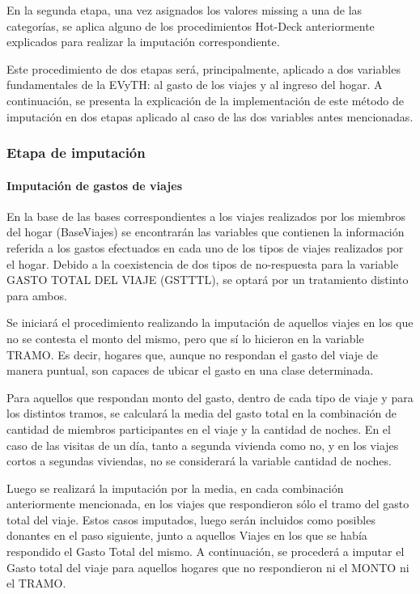 \documentclass[
  openany]{book}
\begin{document}
En la segunda etapa, una vez asignados los valores missing a una de las categorías, se aplica alguno de los procedimientos Hot-Deck anteriormente explicados para realizar la imputación correspondiente.

Este procedimiento de dos etapas será, principalmente, aplicado a dos variables fundamentales de la EVyTH: al gasto de los viajes y al ingreso del hogar. A continuación, se presenta la explicación de la implementación de este método de imputación en dos etapas aplicado al caso de las dos variables antes mencionadas.

\hypertarget{etapa-de-imputaciuxf3n}{%
\subsubsection{Etapa de imputación}\label{etapa-de-imputaciuxf3n}}

\hypertarget{imputaciuxf3n-de-gastos-de-viajes}{%
\paragraph{Imputación de gastos de viajes}\label{imputaciuxf3n-de-gastos-de-viajes}}

En la base de las bases correspondientes a los viajes realizados por los miembros del hogar (BaseViajes) se encontrarán las variables que contienen la información referida a los gastos efectuados en cada uno de los tipos de viajes realizados por el hogar. Debido a la coexistencia de dos tipos de no-respuesta para la variable GASTO TOTAL DEL VIAJE (GSTTTL), se optará por un tratamiento distinto para ambos.

Se iniciará el procedimiento realizando la imputación de aquellos viajes en los que no se contesta el monto del mismo, pero que sí lo hicieron en la variable TRAMO. Es decir, hogares que, aunque no respondan el gasto del viaje de manera puntual, son capaces de ubicar el gasto en una clase determinada.

Para aquellos que respondan monto del gasto, dentro de cada tipo de viaje y para los distintos tramos, se calculará la media del gasto total en la combinación de cantidad de miembros participantes en el viaje y la cantidad de noches. En el caso de las visitas de un día, tanto a segunda vivienda como no, y en los viajes cortos a segundas viviendas, no se considerará la variable cantidad de noches.

Luego se realizará la imputación por la media, en cada combinación anteriormente mencionada, en los viajes que respondieron sólo el tramo del gasto total del viaje. Estos casos imputados, luego serán incluidos como posibles donantes en el paso siguiente, junto a aquellos Viajes en los que se había respondido el Gasto Total del mismo. A continuación, se procederá a imputar el Gasto total del viaje para aquellos hogares que no respondieron ni el MONTO ni el TRAMO.
\end{document}
